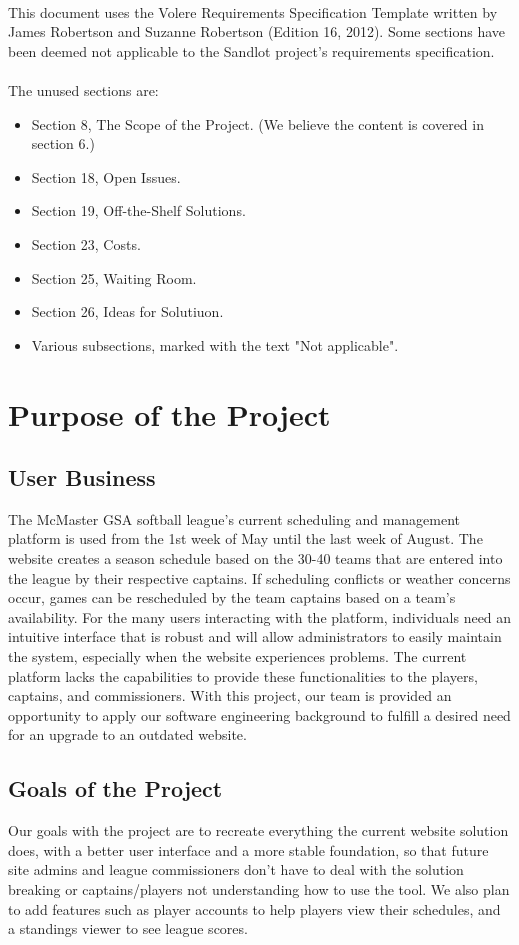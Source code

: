 \documentclass[12pt]{article}
\begin{document}
~\newpage

This document uses the Volere Requirements Specification Template written by
James Robertson and Suzanne Robertson (Edition 16, 2012). Some sections have been deemed not
applicable to the Sandlot project's requirements specification.\\\\
The unused sections are:
\begin{itemize}
  \item Section 8, The Scope of the Project. (We believe the content is covered
  in section 6.)
  \item Section 18, Open Issues.
  \item Section 19, Off-the-Shelf Solutions.
  \item Section 23, Costs.
  \item Section 25, Waiting Room.
  \item Section 26, Ideas for Solutiuon.
  \item Various subsections, marked with the text "Not applicable".
\end{itemize}

\section{Purpose of the Project}

\subsection{User Business}

The McMaster GSA softball league's current scheduling and management platform
is used from the 1st week of May until the last week of August. The website
creates a season schedule based on the 30-40 teams that are entered into the
league by their respective captains. If scheduling conflicts or weather concerns
occur, games can be rescheduled by the team captains based on a team's
availability. For the many users interacting with the platform, individuals need
an intuitive interface that is robust and will allow administrators to easily
maintain the system, especially when the website experiences problems. The current
platform lacks the capabilities to provide these functionalities to the players,
captains, and commissioners. With this project, our team is provided an
opportunity to apply our software engineering background to fulfill a
desired need for an upgrade to an outdated website.

\subsection{Goals of the Project}
Our goals with the project are to recreate everything the current website
solution does, with a better user interface and a more stable foundation, so
that future site admins and league commissioners don't have to deal with the
solution breaking or captains/players not understanding how to use the tool.
We also plan to add features such as player accounts to help players view
their schedules, and a standings viewer to see league scores.
\end{document}
